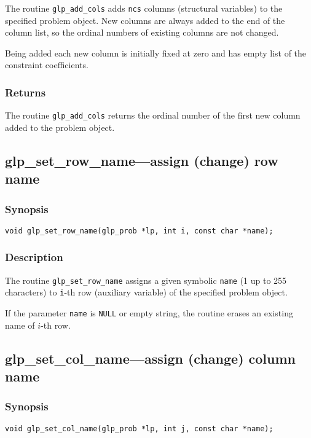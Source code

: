 The routine \verb|glp_add_cols| adds \verb|ncs| columns (structural
variables) to the specified problem object. New columns are always added
to the end of the column list, so the ordinal numbers of existing
columns are not changed.

Being added each new column is initially fixed at zero and has empty
list of the constraint coefficients.

\subsubsection*{Returns}

The routine \verb|glp_add_cols| returns the ordinal number of the first
new column added to the problem object.

\subsection{glp\_set\_row\_name---assign (change) row name}

\subsubsection*{Synopsis}

\begin{verbatim}
void glp_set_row_name(glp_prob *lp, int i, const char *name);
\end{verbatim}

\subsubsection*{Description}

The routine \verb|glp_set_row_name| assigns a given symbolic
\verb|name| (1 up to 255 characters) to \verb|i|-th row (auxiliary
variable) of the specified problem object.

If the parameter \verb|name| is \verb|NULL| or empty string, the routine
erases an existing name of $i$-th row.

\subsection{glp\_set\_col\_name---assign (change) column name}

\subsubsection*{Synopsis}

\begin{verbatim}
void glp_set_col_name(glp_prob *lp, int j, const char *name);
\end{verbatim}


